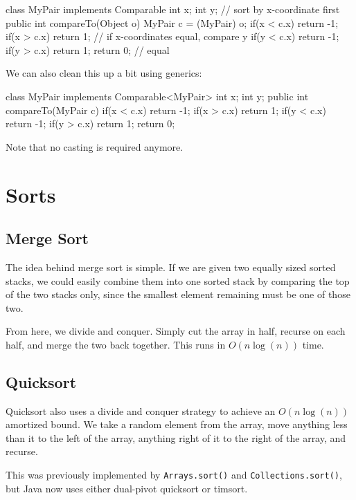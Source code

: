 \documentclass[11pt]{book}
\begin{document}
\begin{mylstlisting}
class MyPair implements Comparable {
	int x;
	int y;
    // sort by x-coordinate first
	public int compareTo(Object o) {
		MyPair c = (MyPair) o;
		if(x < c.x) return -1;
		if(x > c.x) return 1;
		// if x-coordinates equal, compare y
		if(y < c.x) return -1;
		if(y > c.x) return 1;
		return 0; // equal
	}
}
\end{mylstlisting}

We can also clean this up a bit using generics:

\begin{mylstlisting}
class MyPair implements Comparable<MyPair> {
	int x;
	int y;
	public int compareTo(MyPair c) {
		if(x < c.x) return -1;
		if(x > c.x) return 1;
		if(y < c.x) return -1;
		if(y > c.x) return 1;
		return 0;
	}
}
\end{mylstlisting}

Note that no casting is required anymore.

\section{Sorts}

\subsection{Merge Sort}

The idea behind merge sort is simple. If we are given two equally sized sorted stacks, we could easily combine them into one sorted stack by comparing the top of the two stacks only, since the smallest element remaining must be one of those two.

From here, we divide and conquer. Simply cut the array in half, recurse on each half, and merge the two back together. This runs in $O(n \log (n))$ time.

\subsection{Quicksort}

Quicksort also uses a divide and conquer strategy to achieve an $O(n \log (n))$ amortized bound. We take a random element from the array, move anything less than it to the left of the array, anything right of it to the right of the array, and recurse.

This was previously implemented by \texttt{Arrays.sort()} and \texttt{Collections.sort()}, but Java now uses either dual-pivot quicksort or timsort.
\end{document}
